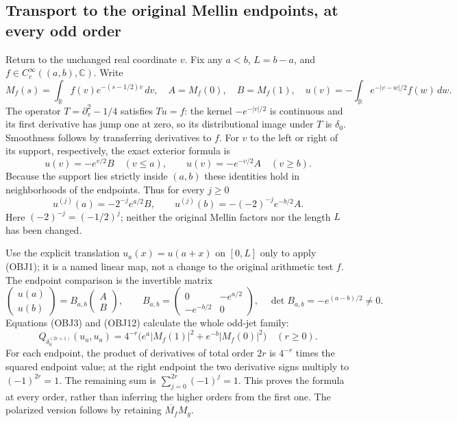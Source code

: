 \subsection{Transport to the original Mellin endpoints, at every odd order}

Return to the unchanged real coordinate $v$. Fix any $a<b$,
$L=b-a$, and $f\in C_c^\infty((a,b),\mathbb C)$. Write
\begin{equation}\tag{OBJ10}
 M_f(s)=\int_{\mathbb R} f(v)e^{-(s-1/2)v}\,dv,
 \quad A=M_f(0),\quad B=M_f(1),\quad
 u(v)=-\int_{\mathbb R}e^{-|v-w|/2}f(w)\,dw.
\end{equation}
The operator $T=\partial_v^2-1/4$ satisfies $Tu=f$:
the kernel $-e^{-|v|/2}$ is continuous and its first derivative has
jump one at zero, so its distributional image under $T$ is $\delta_0$.
Smoothness follows by transferring derivatives to $f$.
For $v$ to the left or right of its support, respectively, the exact
exterior formula is
\begin{equation}\tag{OBJ11}
 u(v)=-e^{v/2}B\quad(v\le a),\qquad
 u(v)=-e^{-v/2}A\quad(v\ge b).
\end{equation}
Because the support lies strictly inside $(a,b)$ these identities
hold in neighborhoods of the endpoints. Thus for every $j\ge0$
\begin{equation}\tag{OBJ12}
 u^{(j)}(a)=-2^{-j}e^{a/2}B,\qquad
 u^{(j)}(b)=-(-2)^{-j}e^{-b/2}A.
\end{equation}
Here $(-2)^{-j}=(-1/2)^j$; neither the original Mellin factors nor
the length $L$ has been changed.

Use the explicit translation $u_a(x)=u(a+x)$ on $[0,L]$ only to
apply (OBJ1); it is a named linear map, not a change to the original
arithmetic test $f$. The endpoint comparison is the invertible
matrix
\begin{equation}\tag{OBJ13}
 \begin{pmatrix}u(a)\\u(b)\end{pmatrix}
  =B_{a,b}\begin{pmatrix}A\\B\end{pmatrix},\qquad
 B_{a,b}=\begin{pmatrix}0&-e^{a/2}\\-e^{-b/2}&0\end{pmatrix},
 \quad \det B_{a,b}=-e^{(a-b)/2}\ne0.
\end{equation}
Equations (OBJ3) and (OBJ12) calculate the whole odd-jet family:
\begin{equation}\tag{OBJ14}
 \boxed{\quad Q_{\delta_0^{(2r+1)}}(u_a,u_a)
 =4^{-r}\bigl(e^a|M_f(1)|^2+e^{-b}|M_f(0)|^2\bigr)
 \quad(r\ge0).\quad}
\end{equation}
For each endpoint, the product of derivatives of total order $2r$
is $4^{-r}$ times the squared endpoint value; at the right endpoint
the two derivative signs multiply to $(-1)^{2r}=1$. The remaining
sum is $\sum_{j=0}^{2r}(-1)^j=1$. This proves the formula at every
order, rather than inferring the higher orders from the first one.
The polarized version follows by retaining $\overline{M_f}M_g$.


